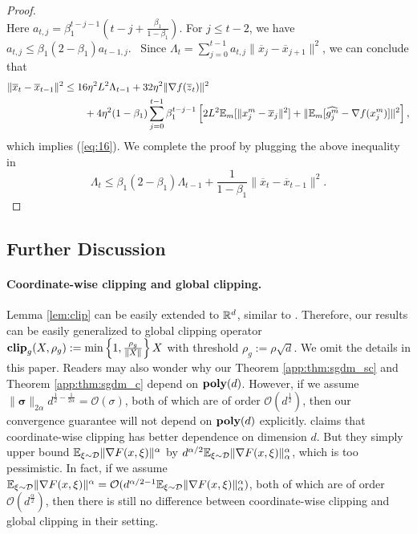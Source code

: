 \documentclass{article} %
\numberwithin{equation}{section}
\renewcommand{\eqref}[1]{(\ref{#1})}
\begin{document}
\begin{proof}
\begin{equation}
    \end{equation}
    Here $a_{t,j}=\beta_1^{t-j-1}(t-j+\frac{\beta_1}{1-\beta_1})$. For $j\leq t-2$, we have $a_{t,j}\leq \beta_1(2-\beta_1)a_{t-1,j}$. \
    Since $\Lambda_t=\sum_{j=0}^{t-1}a_{t,j}\|\overline{x}_j-\overline{x}_{j+1}\|^2$, we can conclude that
    \begin{equation}
        \begin{aligned}
            \|\overline{x}_t-\overline{x}_{t-1}\|^2
            &\leq 16\eta^2L^2\Lambda_{t-1} + 32\eta^2\|\nabla f(\overline{z}_t)\|^2\\ 
            &\qquad + 4\eta^2(1-\beta_1)\sum_{j=0}^{t-1}\beta_1^{t-j-1}\left[2L^2\mathbb{E}_m[\|x_j^m-\overline{x}_j\|^2]+\|\mathbb{E}_m[\widehat{g_j^m}-\nabla f(x_j^m)]\|^2 \right],
        \end{aligned}
    \end{equation}
    which implies \eqref{eq:16}. We complete the proof by plugging the above inequality in
    \begin{equation}
        \Lambda_t \leq \beta_1(2-\beta_1)\Lambda_{t-1} + \frac{1}{1-\beta_1}\|\overline{x}_t-\overline{x}_{t-1}\|^2.
    \end{equation}
\end{proof}

\subsection{Further Discussion}\label{app:subsec:discuss_sgdm}

\paragraph{Coordinate-wise clipping and global clipping.}
Lemma \ref{lem:clip} can be easily extended to $\mathbb{R}^d$, similar to \citet[Lemma 5.1]{pmlr-v202-sadiev23a}. Therefore, our results can be easily generalized to global clipping operator $\textbf{clip}_g(X,\rho_g):=\min\left\{1,\frac{\rho_g}{\|X\|}\right\}X$ with threshold $\rho_g:=\rho\sqrt{d}$. We omit the details in this paper.
Readers may also wonder why our Theorem \ref{app:thm:sgdm_sc} and Theorem \ref{app:thm:sgdm_c} depend on $\textbf{poly}(d)$. 
However, if we assume $\|\boldsymbol{\sigma}\|_{2\alpha}d^{\frac{1}{2}-\frac{1}{2\alpha}}=\mathcal{O}(\sigma)$, both of which are of order $\mathcal{O}(d^{\frac{1}{2}})$, then our convergence guarantee will not depend on $\textbf{poly}(d)$ explicitly.
\citet[Corollary 7]{zhang2020adaptive} claims that coordinate-wise clipping has better dependence on dimension $d$. But they simply upper bound $\mathbb{E}_{\xi\sim\mathcal{D}} \|\nabla F(x,\xi)\|^\alpha$ by $d^{\alpha/2}\mathbb{E}_{\xi\sim\mathcal{D}} \|\nabla F(x,\xi)\|_\alpha^\alpha$, which is too pessimistic.
In fact, if we assume $\mathbb{E}_{\xi\sim\mathcal{D}} \|\nabla F(x,\xi)\|^\alpha = \mathcal{O}(d^{\alpha/2-1}\mathbb{E}_{\xi\sim\mathcal{D}} \|\nabla F(x,\xi)\|_\alpha^\alpha)$, both of which are of order $\mathcal{O}(d^{\frac{\alpha}{2}})$, then there is still no difference between coordinate-wise clipping and global clipping in their setting.
\end{document}

